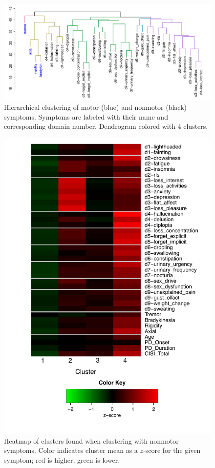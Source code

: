 \documentclass[preprint,3p,twocolumn]{elsarticle} %
\begin{document}
\begin{figure}[t]
  \centering
  \includegraphics[width=\linewidth]{nms30m-colhc-pub.pdf}
  \caption{Hierarchical clustering of motor (blue) and nonmotor (black) symptoms. Symptoms are
  labeled with their name and corresponding domain number. Dendrogram colored with 4 clusters.}
  \label{fig:hc}
\end{figure}

\begin{figure}[p]
  \centering
  \includegraphics[width=0.7\linewidth]{nms30-hm-pub.pdf}
  \caption{Heatmap of clusters found when clustering with nonmotor symptoms. Color indicates
    cluster mean as a $z$-score for the given symptom; red is higher, green is lower.}
  \label{fig:nms30-hm}
\end{figure}
\end{document}
